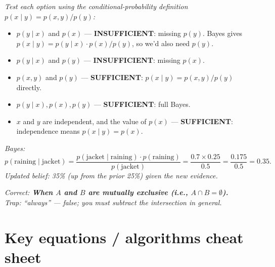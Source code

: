 \documentclass[11pt, a4paper]{article}
\begin{document}
\begin{exambox}
\textit{Test each option using the conditional-probability definition $p(x \mid y) = p(x, y) / p(y)$:}
\begin{itemize}[leftmargin=*, itemsep=0pt, topsep=0pt]
  \item $p(y \mid x)$ and $p(x)$ — \textbf{INSUFFICIENT}: missing $p(y)$. Bayes gives $p(x \mid y) = p(y \mid x) \cdot p(x) / p(y)$, so we'd also need $p(y)$.
  \item $p(y \mid x)$ and $p(y)$ — \textbf{INSUFFICIENT}: missing $p(x)$.
  \item $p(x, y)$ and $p(y)$ — \textbf{SUFFICIENT}: $p(x \mid y) = p(x, y) / p(y)$ directly.
  \item $p(y \mid x), p(x), p(y)$ — \textbf{SUFFICIENT}: full Bayes.
  \item $x$ and $y$ are independent, and the value of $p(x)$ — \textbf{SUFFICIENT}: independence means $p(x \mid y) = p(x)$.
\end{itemize}
\end{exambox}

\begin{exambox}[(MCQ): You are at the gym. $p(\text{raining}) = 0.25$. Your friend wears a jacket regardless: $p(\text{jacket}) = 0.5$. They wear it more often when raining: $p(\text{jacket} \mid \text{raining}) = 0.7$. What is $p(\text{raining} \mid \text{jacket})$?]
\textit{Bayes:}
\[
p(\text{raining} \mid \text{jacket}) = \frac{p(\text{jacket} \mid \text{raining}) \cdot p(\text{raining})}{p(\text{jacket})} = \frac{0.7 \times 0.25}{0.5} = \frac{0.175}{0.5} = 0.35.
\]
\textit{Updated belief: 35\% (up from the prior 25\%) given the new evidence.}
\end{exambox}

\begin{exambox}[(MCQ): For events $A$ and $B$, when is $P(A \cup B) = P(A) + P(B)$?]
\textit{Correct: \textbf{When $A$ and $B$ are mutually exclusive (i.e., $A \cap B = \emptyset$).}}\\[0.3em]
\textit{Trap: ``always'' — false; you must subtract the intersection in general.}
\end{exambox}

\section*{Key equations / algorithms cheat sheet}
\end{document}
